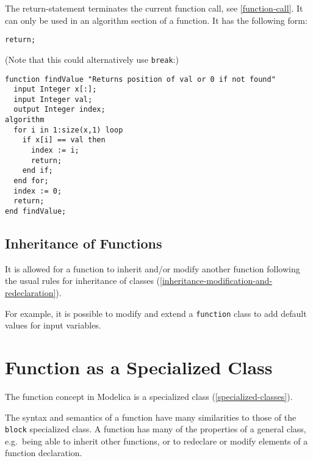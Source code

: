 The return-statement terminates the current function call, see \cref{function-call}.
It can only be used in an algorithm section of a function.
It has the following form:
\begin{lstlisting}[language=modelica]
return;
\end{lstlisting}

\begin{example}
(Note that this could alternatively use \lstinline!break!:)
\begin{lstlisting}[language=modelica]
function findValue "Returns position of val or 0 if not found"
  input Integer x[:];
  input Integer val;
  output Integer index;
algorithm
  for i in 1:size(x,1) loop
    if x[i] == val then
      index := i;
      return;
    end if;
  end for;
  index := 0;
  return;
end findValue;
\end{lstlisting}
\end{example}

\subsection{Inheritance of Functions}\label{inheritance-of-functions}

It is allowed for a function to inherit and/or modify another function
following the usual rules for inheritance of classes (\cref{inheritance-modification-and-redeclaration}).

\begin{nonnormative}
For example, it is possible to modify and extend a \lstinline!function! class to add default values for input variables.
\end{nonnormative}

\section{Function as a Specialized Class}\label{function-as-a-specialized-class}

The function concept in Modelica is a specialized class (\cref{specialized-classes}).

\begin{nonnormative}
The syntax and semantics of a function have many similarities to those of the \lstinline!block! specialized class. A function has many of the properties
of a general class, e.g.\ being able to inherit other functions, or to redeclare or modify elements of a function declaration.
\end{nonnormative}

